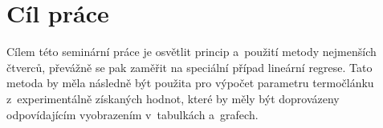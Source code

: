 \section{Cíl práce}
Cílem této seminární práce je osvětlit princip a~použití metody nejmenších
čtverců, převážně se pak zaměřit na speciální případ lineární regrese. Tato
metoda by měla následně být použita pro výpočet parametru termočlánku
z~experimentálně získaných hodnot, které by měly být doprovázeny odpovídajícím
vyobrazením v~tabulkách a~grafech. 
